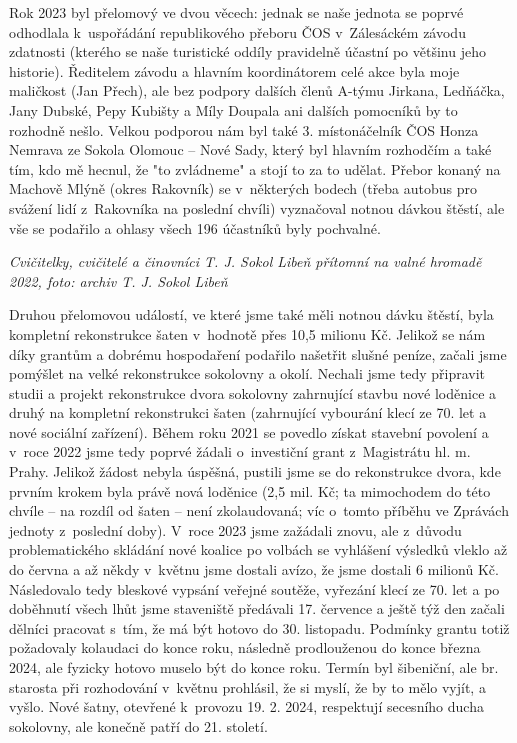 \documentclass[a5paper, 12pt, twoside]{article}
\begin{document}
Rok 2023 byl přelomový ve dvou věcech: jednak se naše jednota se poprvé
odhodlala k~uspořádání republikového přeboru ČOS v~Zálesáckém závodu
zdatnosti (kterého se naše turistické oddíly pravidelně účastní po
většinu jeho historie). Ředitelem závodu a hlavním koordinátorem celé
akce byla moje maličkost (Jan Přech), ale bez podpory dalších členů
A-týmu Jirkana, Ledňáčka, Jany Dubské, Pepy Kubišty a Míly Doupala ani
dalších pomocníků by to rozhodně nešlo. Velkou podporou nám byl také 3.
místonáčelník ČOS Honza Nemrava ze Sokola Olomouc -- Nové Sady, který
byl hlavním rozhodčím a také tím, kdo mě hecnul, že "to zvládneme" a
stojí to za to udělat. Přebor konaný na Machově Mlýně (okres Rakovník)
se v~některých bodech (třeba autobus pro svážení lidí z~Rakovníka na
poslední chvíli) vyznačoval notnou dávkou štěstí, ale vše se podařilo a
ohlasy všech 196 účastníků byly pochvalné.


\textit{Cvičitelky, cvičitelé a činovníci T. J. Sokol Libeň přítomní na
valné hromadě 2022, foto: archiv T. J. Sokol Libeň}

Druhou přelomovou událostí, ve které jsme také měli notnou dávku štěstí,
byla kompletní rekonstrukce šaten v~hodnotě přes 10,5 milionu Kč.
Jelikož se nám díky grantům a dobrému hospodaření podařilo našetřit
slušné peníze, začali jsme pomýšlet na velké rekonstrukce sokolovny a
okolí. Nechali jsme tedy připravit studii a projekt rekonstrukce dvora
sokolovny zahrnující stavbu nové loděnice a druhý na kompletní
rekonstrukci šaten (zahrnující vybourání klecí ze 70. let a nové
sociální zařízení). Během roku 2021 se povedlo získat stavební povolení
a v~roce 2022 jsme tedy poprvé žádali o~investiční grant z~Magistrátu
hl. m. Prahy. Jelikož žádost nebyla úspěšná, pustili jsme se do
rekonstrukce dvora, kde prvním krokem byla právě nová loděnice (2,5 mil.
Kč; ta mimochodem do této chvíle -- na rozdíl od šaten -- není
zkolaudovaná; víc o~tomto příběhu ve Zprávách jednoty z~poslední doby).
V~roce 2023 jsme zažádali znovu, ale z~důvodu problematického skládání
nové koalice po volbách se vyhlášení výsledků vleklo až do června a až
někdy v~květnu jsme dostali avízo, že jsme dostali 6 milionů Kč.
Následovalo tedy bleskové vypsání veřejné soutěže, vyřezání klecí ze 70.
let a po doběhnutí všech lhůt jsme staveniště předávali 17. července a
ještě týž den začali dělníci pracovat s~tím, že má být hotovo do 30.
listopadu. Podmínky grantu totiž požadovaly kolaudaci do konce roku,
následně prodlouženou do konce března 2024, ale fyzicky hotovo muselo
být do konce roku. Termín byl šibeniční, ale br. starosta při
rozhodování v~květnu prohlásil, že si myslí, že by to mělo vyjít, a
vyšlo. Nové šatny, otevřené k~provozu 19. 2. 2024, respektují secesního
ducha sokolovny, ale konečně patří do 21. století.
\end{document}
